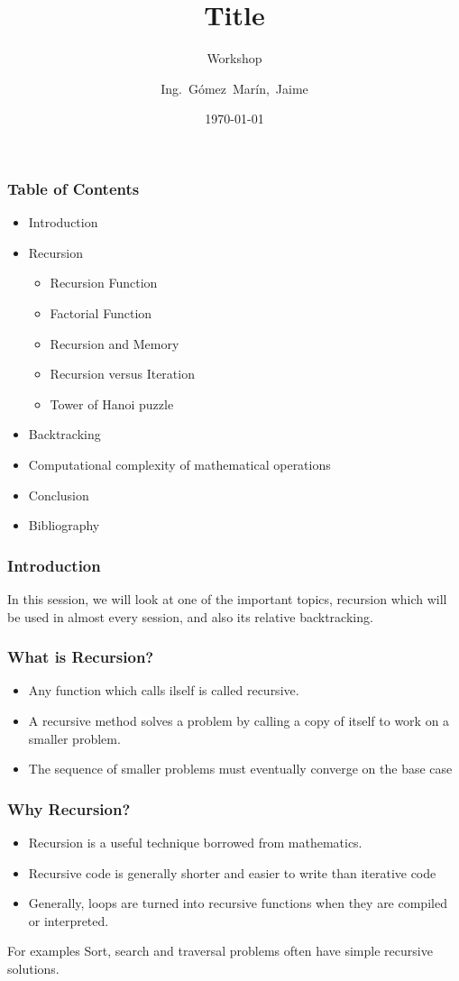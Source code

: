 \documentclass{beamer}
\title[Title inside foot page] %
{Title}
\subtitle{Workshop}
\author[JGM] %
{Ing.~Gómez~Marín,~Jaime}
\institute[TECSUP] %
{
  
    TdG Department
}
\date{\today}
\begin{document}
\begin{frame}
\titlepage
\end{frame}

\begin{frame}
\frametitle{Table of Contents}
\begin{itemize}
\item Introduction
\item Recursion
\begin{itemize}
\item Recursion Function
\item Factorial Function
\item Recursion and Memory
\item Recursion versus Iteration
\item Tower of Hanoi puzzle
\end{itemize}
\item Backtracking
\item Computational complexity of mathematical operations
\item Conclusion
\item Bibliography
\end{itemize}
\end{frame}

\begin{frame}
\frametitle{Introduction}
 
In this session, we will look at one of the important topics,
\alert{recursion} which will be used in almost every session, and also
its relative \alert{backtracking}.

\end{frame}


\begin{frame}
\frametitle{What is Recursion?}
\begin{itemize}
\item Any function which \alert{calls ilself} is called recursive.
\item A recursive method solves a problem by calling a copy of itself
to work on a \alert{smaller problem}.
\item The sequence of smaller problems must eventually converge on the \alert{base case}
\end{itemize}
\end{frame}


\begin{frame}
\frametitle{Why Recursion?}
\begin{itemize}
\item Recursion is a useful \alert{ technique} borrowed from mathematics.
\item Recursive code is generally shorter and easier to write than iterative code
\item Generally, loops are turned into recursive functions when they are compiled or
interpreted.
\end{itemize}

\begin{block}{For examples}
Sort, search and traversal problems often have simple recursive solutions.
\end{block}

\end{frame}
\end{document}
